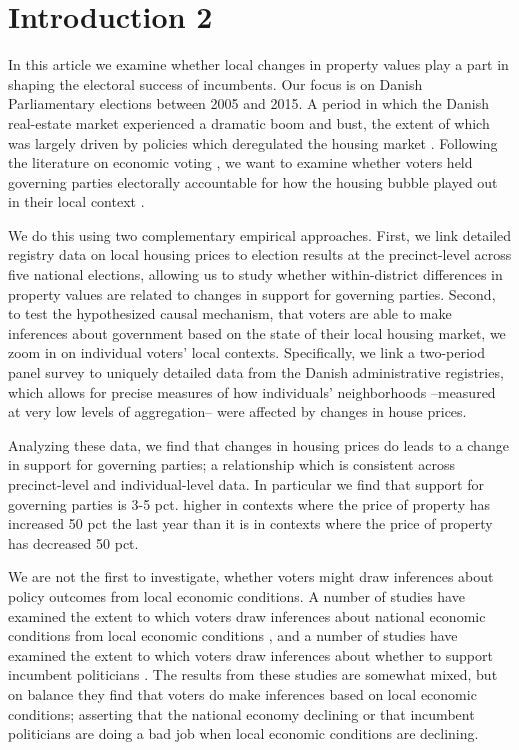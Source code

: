 \documentclass[12pt,a4paper]{article}
\begin{document}
\section{Introduction 2}

In this article we examine whether local changes in property values play a part in shaping the electoral success of incumbents. Our focus is on Danish Parliamentary elections between 2005 and 2015. A period in which the Danish real-estate market  experienced a dramatic boom and bust, the extent of which was largely driven by policies which deregulated the housing market \citep{dam2011housing}. Following the literature on economic voting \citep{healy2013retrospective,lewis2013vp}, we want to examine whether voters held governing parties electorally accountable for how the housing bubble played out in their local context . 

We do this using two complementary empirical approaches. First, we link detailed registry data on local housing prices to election results at the precinct-level across five national elections, allowing us to study whether within-district differences in property values are related to changes in support for governing parties. Second, to test the hypothesized causal mechanism, that voters are able to make inferences about government based on the state of their local housing market, we zoom in on individual voters’ local contexts. Specifically, we link a two-period panel survey to uniquely detailed data from the Danish administrative registries, which allows for precise measures of how individuals’ neighborhoods --measured at very low levels of aggregation-- were affected by changes in house prices.

Analyzing these data, we find that changes in housing prices do leads to a change in support for governing parties; a relationship which is consistent across precinct-level and individual-level data. In particular we find that support for governing parties is 3-5 pct. higher in contexts where the price of property has increased 50 pct the last year than it is in contexts where the price of property has decreased 50 pct.

We are not the first to investigate, whether voters might draw inferences about policy outcomes from local economic conditions. A number of studies have examined the extent to which voters draw inferences about national economic conditions from local economic conditions \citep{books1999contextual,reeves2012ecologies,anderson2011local,ansolabehere2014mecro,dinesen2015reconsidering}, and a number of studies have examined the extent to which voters draw inferences about whether to support incumbent politicians  \citep{hansford2015reevaluating,eisenberg2004economic,kim2003spatial,healy2014presidential}. The results from these studies are somewhat mixed, but on balance they find that voters do make inferences based on local economic conditions; asserting that the national economy declining or that incumbent politicians are doing a bad job when local economic conditions are declining. 
\end{document}
